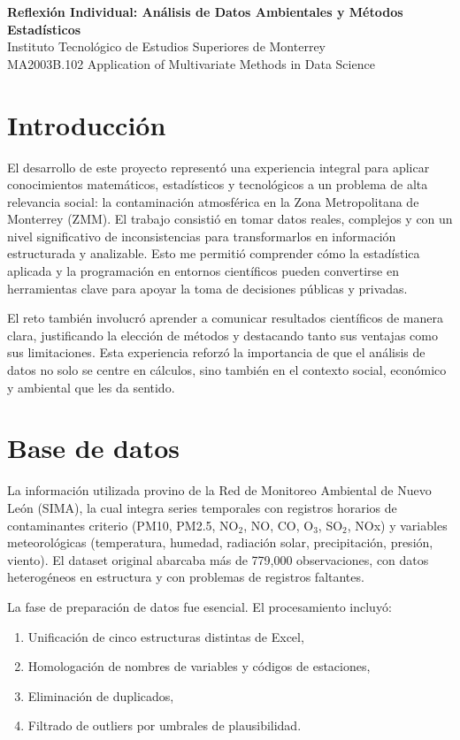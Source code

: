 \documentclass[12pt]{article}
\begin{document}
\begin{center}
\textbf{Reflexión Individual: Análisis de Datos Ambientales y Métodos Estadísticos} \\
Instituto Tecnológico de Estudios Superiores de Monterrey \\
MA2003B.102 Application of Multivariate Methods in Data Science \\
\end{center}

\section*{Introducción}
El desarrollo de este proyecto representó una experiencia integral para aplicar conocimientos matemáticos, estadísticos y tecnológicos a un problema de alta relevancia social: la contaminación atmosférica en la Zona Metropolitana de Monterrey (ZMM). El trabajo consistió en tomar datos reales, complejos y con un nivel significativo de inconsistencias para transformarlos en información estructurada y analizable.
Esto me permitió comprender cómo la estadística aplicada y la programación en entornos científicos pueden convertirse en herramientas clave para apoyar la toma de decisiones públicas y privadas.

El reto también involucró aprender a comunicar resultados científicos de manera clara, justificando la elección de métodos y destacando tanto sus ventajas como sus limitaciones.
Esta experiencia reforzó la importancia de que el análisis de datos no solo se centre en cálculos, sino también en el contexto social, económico y ambiental que les da sentido.


\section*{Base de datos}
La información utilizada provino de la Red de Monitoreo Ambiental de Nuevo León (SIMA), la cual integra series temporales con registros horarios de contaminantes criterio (PM10, PM2.5, NO$_2$, NO, CO, O$_3$, SO$_2$, NOx) y variables meteorológicas (temperatura, humedad, radiación solar, precipitación, presión, viento). El dataset original abarcaba más de 779,000 observaciones, con datos heterogéneos en estructura y con problemas de registros faltantes.

La fase de preparación de datos fue esencial. El procesamiento incluyó:
\begin{enumerate}[label=\alph*)]
  \item Unificación de cinco estructuras distintas de Excel,
  \item Homologación de nombres de variables y códigos de estaciones,
  \item Eliminación de duplicados,
  \item Filtrado de outliers por umbrales de plausibilidad.
\end{enumerate}
\end{document}
